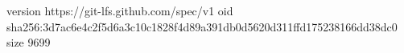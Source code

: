 version https://git-lfs.github.com/spec/v1
oid sha256:3d7ac6e4c2f5d6a3c10c1828f4d89a391db0d5620d311ffd175238166dd38dc0
size 9699
